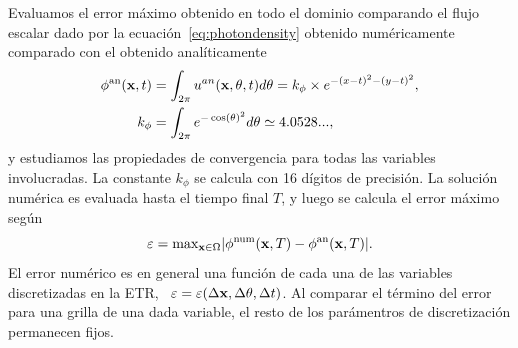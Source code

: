Evaluamos el error máximo obtenido en todo el dominio 
comparando el flujo escalar dado por la ecuación~\eqref{eq:photondensity} 
obtenido numéricamente comparado con el obtenido analíticamente
\begin{equation*}
\begin{split}
\begin{aligned}
\phi^{\text{an}}(\mathbf{x},t)&=\int_{2\pi} u^{an}(\mathbf{x},\theta,t) d\theta=
k_{\phi}\times e^{-(x-t)^2-(y-t)^2},\\
k_{\phi}&=\int_{2\pi}e^{-\cos(\theta)^2}d\theta\simeq 4.0528...,
\end{aligned}
\end{split}
\label{eq:photondensityan}
\end{equation*}
y estudiamos las propiedades de convergencia 
para todas las variables involucradas. La constante 
$k_{\phi}$ se calcula con 16 dígitos de precisión. 
La solución numérica es evaluada hasta el tiempo final $T$, 
y luego se calcula el error máximo según
\begin{equation*}
\varepsilon=\text{max}_{\mathbf{x} \in \Omega} |\phi^{\text{num}}(\mathbf{x},T) -\phi^{\text{an}}(\mathbf{x},T)|.
\label{eq:maximumerror}
\end{equation*}
El error numérico es en general una función 
de cada una de las variables discretizadas en la ETR, 
\ie~$\varepsilon=\varepsilon(\Delta \mathbf{x}, \Delta \theta, \Delta t)$. 
Al comparar el término del error para una grilla de una dada variable, 
el resto de los parámentros de discretización permanecen fijos.

